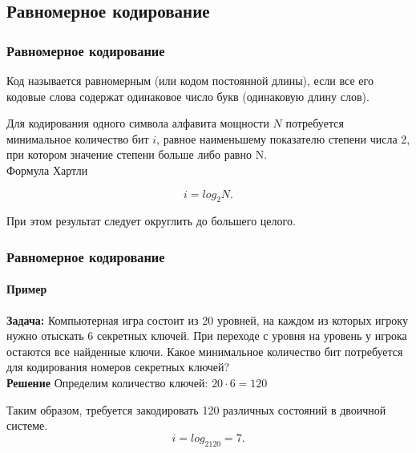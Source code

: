  \subsection{Равномерное кодирование}
\begin{frame}
\frametitle{Равномерное кодирование}

Код называется равномерным (или кодом постоянной длины), если все его кодовые слова содержат одинаковое число букв (одинаковую длину слов).

Для кодирования одного символа алфавита мощности $N$ потребуется минимальное количество бит $i$, равное наименьшему  показателю степени числа 2, при котором значение степени больше либо равно N. \\
Формула Хартли

$$i = log_2N.$$

При этом результат следует округлить до большего целого.

\end{frame}
\begin{frame}
\frametitle{Равномерное кодирование}
\framesubtitle{Пример}

\textbf{Задача:} Компьютерная игра состоит из 20 уровней, на каждом из которых игроку нужно отыскать 6 секретных ключей. При переходе с уровня на уровень у игрока остаются все найденные ключи. Какое минимальное количество бит потребуется для кодирования номеров секретных ключей?  \\ \pause
\textbf{Решение}
Определим количество ключей:	$20\cdot 6  =  120$

Таким образом, требуется закодировать 120 различных состояний в двоичной системе. 
$$i  = log_2120  =  7.$$

\end{frame}


